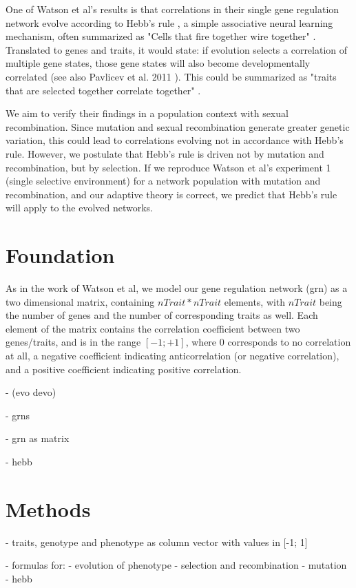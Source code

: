 \documentclass{article}
\begin{document}
One of Watson et al's results is that correlations in their single gene regulation network evolve according to Hebb’s rule \cite{hebb}, a simple associative neural learning mechanism, often summarized as "Cells that fire together wire together" \cite{Lowel209}. Translated to genes and traits, it would state: if evolution selects a correlation of multiple gene states, those gene states will also become developmentally correlated (see also Pavlicev et al. 2011 \cite{pavlicev2011}). This could be summarized as "traits that are selected together correlate together" \cite{watson2014}.

We aim to verify their findings in a population context with sexual recombination.
Since mutation and sexual recombination generate greater genetic variation, this could lead to correlations evolving not in accordance with Hebb's rule. However, we postulate that Hebb’s rule is driven not by mutation and recombination, but by selection. If we reproduce Watson et al’s experiment 1 (single selective environment) for a network population with mutation and recombination, and our adaptive theory is correct, we predict that Hebb’s rule will apply to the evolved networks.

\section{Foundation}

As in the work of Watson et al, we model our gene regulation network (grn) as a two dimensional matrix, containing $nTrait * nTrait$ elements, with $nTrait$ being the number of genes and the number of corresponding traits as well. Each element of the matrix contains the correlation coefficient between two genes/traits, and is in the range $[-1; +1]$, where 0 corresponds to no correlation at all, a negative coefficient indicating anticorrelation (or negative correlation), and a positive coefficient indicating positive correlation.

- (evo devo)

- grns

- grn as matrix

- hebb


\section{Methods}

- traits, genotype and phenotype as column vector with values in [-1; 1]

- formulas for:
	- evolution of phenotype
	- selection and recombination
	- mutation
	- hebb
\end{document}

